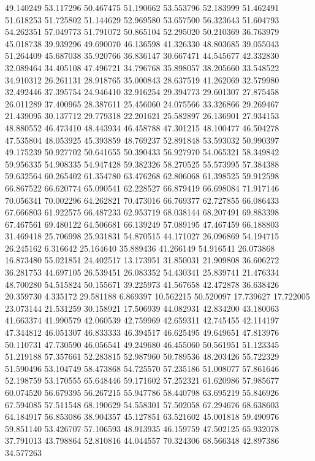 49.140249
53.117296
50.467475
51.190662
53.553796
52.183999
51.462491
51.618253
51.725802
51.144629
52.969580
53.657500
56.323643
51.604793
54.262351
57.049773
51.791072
50.865104
52.295020
50.210369
36.763979
45.018738
39.939296
49.690070
46.136598
41.326330
48.803685
39.055043
51.264409
45.687038
35.920766
36.836147
30.667471
44.545677
42.332830
32.089464
34.405108
47.496721
34.796768
35.898057
38.205660
33.548522
34.910312
26.261131
28.918765
35.000843
28.637519
41.262069
32.579980
32.492446
37.395754
24.946410
32.916254
29.394773
29.601307
27.875458
26.011289
37.400965
28.387611
25.456060
24.075566
33.326866
29.269467
21.439095
30.137712
29.779318
22.201621
25.582897
26.136901
27.934153
48.880552
46.473410
48.443934
46.458788
47.301215
48.100477
46.504278
47.535804
48.053925
45.393859
48.769237
52.891848
53.593032
50.990397
49.175239
50.927702
50.641655
50.390433
56.927970
54.065321
58.349842
59.956335
54.908335
54.947428
59.382326
58.270525
55.573995
57.384388
59.632564
60.265402
61.354780
63.476268
62.806068
61.398525
59.912598
66.867522
66.620774
65.090541
62.228527
66.879419
66.698084
71.917146
70.056341
70.002296
64.262821
70.473016
66.769377
62.727855
66.086433
67.666803
61.922575
66.487233
62.953719
68.038144
68.207491
69.883398
67.467561
69.480122
64.506681
66.139249
57.089195
47.467459
66.188803
31.469418
25.706998
25.931831
54.870515
44.171027
26.096869
54.194715
26.245162
6.316642
25.164640
35.889436
41.266149
54.916541
26.073868
16.873480
55.021851
24.402517
13.173951
31.850031
21.909808
36.606272
36.281753
44.697105
26.539451
26.083352
54.430341
25.839741
21.476334
48.700280
54.515824
50.155671
39.225973
41.567658
42.472878
36.638426
20.359730
4.335172
29.581188
6.869397
10.562215
50.520097
17.739627
17.722005
23.073144
21.531259
30.158921
17.506939
44.082931
42.834200
43.180063
41.663374
41.990579
42.060539
42.759969
42.659311
42.745455
42.114197
47.344812
46.051307
46.833333
46.394517
46.625495
49.649651
47.813976
50.110731
47.730590
46.056541
49.249680
46.455060
50.561951
51.123345
51.219188
57.357661
52.283815
52.987960
50.789536
48.203426
55.722329
51.590496
53.104749
58.473868
54.725570
57.235186
51.008077
57.861646
52.198759
53.170555
65.648446
59.171602
57.252321
61.620986
57.985677
60.074520
56.679395
56.267215
55.947786
58.440798
63.695219
55.846926
67.594085
57.511548
68.190629
54.558301
57.502058
67.294676
68.638603
64.184917
56.853086
38.904357
45.127851
63.521602
45.001818
59.490976
59.851140
53.426707
57.106593
48.913935
46.159759
47.502125
65.932078
37.791013
43.798864
52.810816
44.044557
70.324306
68.566348
42.897386
34.577263

